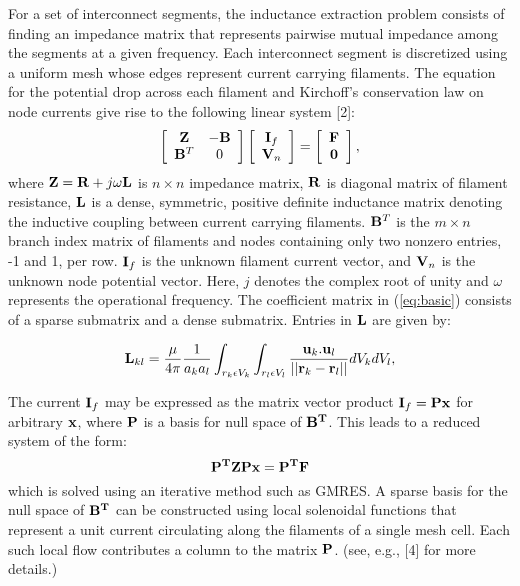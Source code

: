 \documentclass{report}
\begin{document}
For a set of interconnect segments, the inductance extraction problem
consists of finding an impedance matrix that represents pairwise mutual
impedance among the segments at a given frequency. Each interconnect
segment is discretized using a uniform mesh whose edges represent current
carrying filaments. The equation for the potential drop across each
filament and Kirchoff's conservation law on node currents give rise to
the following linear system [2]:
\begin{equation}
\label{eq:basic}
\left[\begin{array}
{c c} {\bf Z} & -{\bf B}\\
{\bf B}^{T} & 0 \end{array} \right ]
\left[\begin{array}
{c}{\bf I}_f \\ {\bf V}_n
\end{array}
\right]
=
\left[\begin{array}
{c}{\bf F} \\
{\bf 0}
\end{array}
\right] ,
\end{equation}
where ${\bf Z} = {\bf R} + j\omega{\bf L}$ is $n \times n$ impedance
matrix, ${\bf R}$ is diagonal matrix of filament resistance, ${\bf L}$ is
a dense, symmetric, positive definite inductance matrix denoting the
inductive coupling between current carrying filaments. ${\bf B}^T$ is the
$m \times n$ branch index matrix of filaments and nodes containing only
two nonzero entries, -1 and 1, per row. ${\bf I}_f$ is the unknown
filament current vector, and ${\bf V}_n$ is the unknown node potential
vector. Here, $j$ denotes the complex root of unity and $\omega$
represents the operational frequency. The coefficient matrix in
(\ref{eq:basic}) consists of a sparse submatrix and a dense submatrix.
Entries in ${\bf L}$ are given by:

$$
{\bf L}_{kl}
=\frac{\mu}{4\pi}\frac{1}{a_{k}a_{l}}\int_{{r_k}\epsilon{V_k}}
\int_{{r_l}\epsilon{V_l}}\frac{{\bf u}_{k}{\bf .}{\bf u}_{l}}{||{\bf
r}_{k}
- {\bf r}_{l} ||} dV_{k}dV_{l},
$$

The current ${\bf I}_f$ may be expressed as the matrix vector product
${\bf I}_f = {\bf Px}$ for arbitrary ${\bf x}$, where ${\bf P}$ is a
basis for null space of ${\bf B^T}$. This leads to a reduced system of
the form:
\begin{equation}
\label{eq:reduced_system}
{\bf P^TZPx} = {\bf P^TF}
\end{equation}
which is solved using an iterative method such as GMRES. A sparse basis
for the null space of ${\bf B^T}$ can be constructed using local
solenoidal functions that represent a unit current
circulating along the filaments of a single mesh cell. Each such local
flow contributes a column to the matrix ${\bf P}$. (see, e.g., [4] for
more details.)
\end{document}
